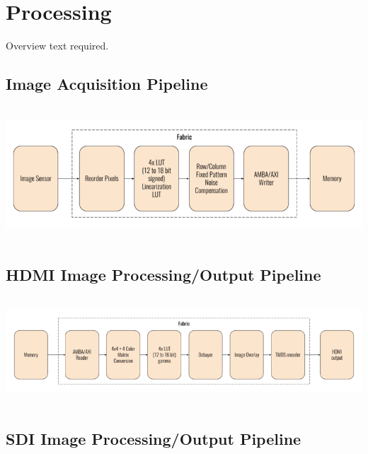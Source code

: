 \section{Processing}

Overview text required.





\subsection{Image Acquisition Pipeline}

\begin{center}
\includegraphics[height=5cm]{images/800px-AXIOM_Beta_Image_Acquisition_Pipeline}
\end{center}





\subsection{HDMI Image Processing/Output Pipeline}

\begin{center}
\includegraphics[height=4cm]{images/800px-AXIOM_Beta_HDMI_Image_Processing_Pipeline}
\end{center}





\subsection{SDI Image Processing/Output Pipeline}



